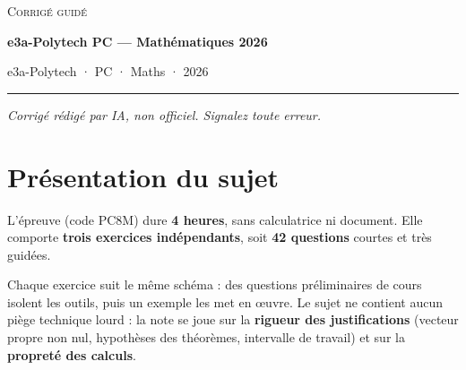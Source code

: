 \documentclass[11pt,a4paper]{article}
\begin{document}
\thispagestyle{plain}
\begin{center}
  {\small\scshape Corrigé guidé}\par\smallskip
  {\LARGE\bfseries e3a-Polytech PC — Mathématiques 2026\par}\medskip
  {\large e3a-Polytech · PC · Maths · 2026\par}
\end{center}
\vspace{2pt}\hrule\vspace{8pt}

\emph{Corrigé rédigé par IA, non officiel. Signalez toute erreur.}

\hypertarget{pruxe9sentation-du-sujet}{%
\section{Présentation du sujet}\label{pruxe9sentation-du-sujet}}

L'épreuve (code PC8M) dure \textbf{4 heures}, sans calculatrice ni document. Elle comporte \textbf{trois exercices indépendants}, soit \textbf{42 questions} courtes et très guidées.

Chaque exercice suit le même schéma : des questions préliminaires de cours isolent les outils, puis un exemple les met en œuvre. Le sujet ne contient aucun piège technique lourd : la note se joue sur la \textbf{rigueur des justifications} (vecteur propre non nul, hypothèses des théorèmes, intervalle de travail) et sur la \textbf{propreté des calculs}.
\end{document}
